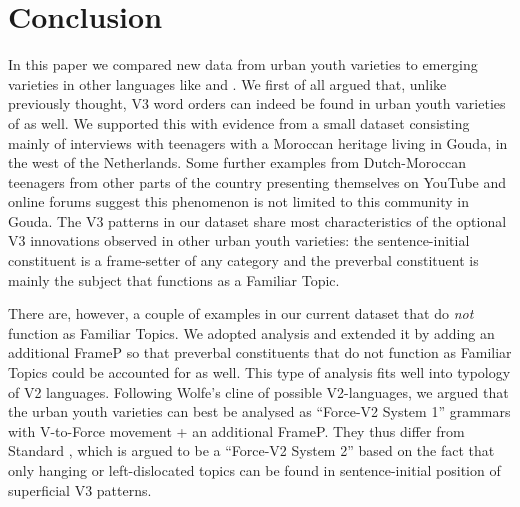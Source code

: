 \documentclass[output=paper]{langsci/langscibook}
\begin{document}
\section{Conclusion}
\label{sec:con}


\noindent In this paper we compared new data from  urban youth varieties
to emerging varieties in other  languages like  and . We
first of all argued that, unlike previously thought, V3 word orders can indeed
be found in urban youth varieties of  as well. We supported this with
evidence from a small dataset consisting mainly of interviews with teenagers
with a Moroccan heritage living in Gouda, in the west of the Netherlands. Some
further examples from Dutch-Moroccan teenagers from other parts of the country
presenting themselves on YouTube and online forums suggest this phenomenon is
not limited to this community in Gouda. The V3 patterns in our dataset share
most characteristics of the optional V3 innovations observed in other 
urban youth varieties: the sentence-initial constituent is a frame-setter of
any category and the preverbal constituent is mainly the subject that functions
as a Familiar Topic.

There are, however, a couple of examples in our current dataset that do
\emph{not} function as Familiar Topics. We adopted 
analysis and extended it by adding an additional FrameP so that preverbal
constituents that do not function as Familiar Topics could be accounted for as
well. This type of analysis fits well into  typology of V2
languages.  Following Wolfe's cline of possible V2-languages, we argued that
the  urban youth varieties can best be analysed as \enquote{Force-V2
System 1} grammars with V-to-Force movement + an additional FrameP. They thus
differ from Standard , which is argued to be a \enquote{Force-V2 System 2}
based on the fact that only hanging or left-dislocated
topics can be found in sentence-initial position of superficial V3
patterns.

\printchapterglossary{}

\end{document}
